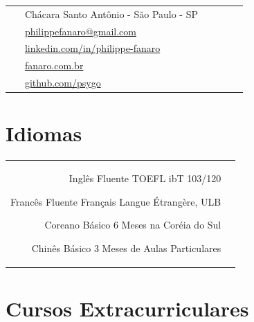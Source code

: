 \documentclass[10pt]{article} %
\begin{document}
\begin{paracol}{2}
{{\begin{supertabular}{p{0.05\linewidth}|p{0.775\linewidth}}
			\raisebox{-1pt}{\faHome} & Chácara Santo Antônio - São Paulo - SP \\
			
			\raisebox{0pt}{\small\faEnvelope} & \href{mailto:philippefanaro@gmail.com}{philippefanaro@gmail.com} \\
			
            \raisebox{-1pt}{\small\faLinkedinSquare} & \href{https://www.linkedin.com/in/philippe-fanaro/}{linkedin.com/in/philippe-fanaro} \\
            
			\raisebox{-1pt}{\small\faLaptop} & \href{http://fanaro.com.br/}{fanaro.com.br} \\
			
			\raisebox{-1pt}{\small\faGithub} & \href{https://github.com/psygo}{github.com/psygo} \\
			
		\end{supertabular}
	}
}

\section{Idiomas} 

\begin{supertabular}{rl}

	
	{Inglês}
	{Fluente}
	{TOEFL ibT 103/120}
	{}
	
	
	{Francês}
	{Fluente}
	{Français Langue Étrangère, ULB}
	{}
	
	
	{Coreano}
	{Básico}
	{6 Meses na Coréia do Sul}
	{}
	
	
	{Chinês}
	{Básico}
	{3 Meses de Aulas Particulares}
	{}
	

\end{supertabular}

\section{Cursos Extracurriculares}


\end{paracol}
\end{document}
